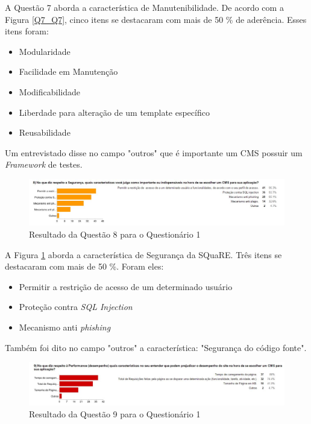 A Questão 7 aborda a característica de Manutenibilidade. De acordo com a Figura \ref{Q7_Q7}, cinco itens se destacaram com mais de 50 \% de aderência. Esses itens foram:

\begin{itemize}
    \item Modularidade
    \item Facilidade em Manutenção
    \item Modificabilidade
    \item Liberdade para alteração de um template específico
    \item Reusabilidade
        
    \end{itemize}
\clearpage    

Um entrevistado disse no campo "outros" que é importante um CMS possuir um  \textit{Framework} de testes.     
    
    
\begin{figure}[!ht]
\centering
\includegraphics[keepaspectratio=true,scale=0.55]{figuras/Ques_1/q8.jpg}
\caption{Resultado da Questão 8 para o Questionário 1}
\label{Q8_Q8}
\end{figure}

A Figura \ref{Q8_Q8} aborda a característica de Segurança da SQuaRE. Três itens se destacaram com mais de 50 \%. Foram eles:
 

\begin{itemize}
    \item Permitir a restrição de acesso de um determinado usuário
    \item Proteção contra \textit{SQL Injection}
    \item Mecanismo anti \textit{phishing}     
    \end{itemize}
    
Também foi dito no campo "outros" a característica:
"Segurança do código fonte".     
     

\begin{figure}[h]
\centering
\includegraphics[keepaspectratio=true,scale=0.45]{figuras/Ques_1/q9.jpg}
\caption{Resultado da Questão 9 para o Questionário 1}
\label{Q9_Q9}
\end{figure}

